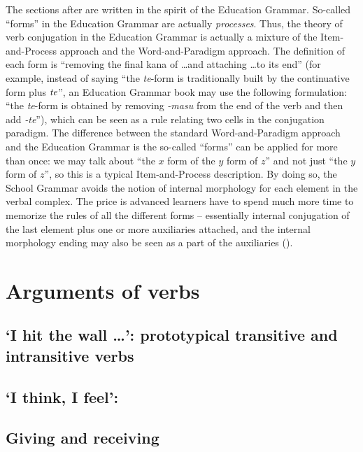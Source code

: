 \documentclass[UTF8, a4paper, oneside, scheme=plain]{ctexrep}
\newcommand{\corpus}[1]{\emph{#1}}
\newcommand{\translate}[1]{`#1'}
\begin{document}
The sections after  are written in the spirit of the Education Grammar.
So-called ``forms'' in the Education Grammar are actually \emph{processes}.
Thus, the theory of verb conjugation in the Education Grammar 
is actually a mixture of the Item-and-Process approach and the Word-and-Paradigm approach.
The definition of each form is 
``removing the final kana of \dots and attaching \dots to its end''
(for example, instead of saying ``the \corpus{te}-form is traditionally built by 
the continuative form plus $\corpus{te}$'',
an Education Grammar book may use the following formulation:
``the \corpus{te}-form is obtained by removing \corpus{-masu} from the end of the verb 
and then add \corpus{-te}''),
which can be seen as a rule relating two cells in the conjugation paradigm.
The difference between the standard Word-and-Paradigm approach and the Education Grammar 
is the so-called ``forms'' can be applied for more than once:
we may talk about ``the $x$ form of the $y$ form of $z$''
and not just ``the $y$ form of $z$'',
so this is a typical Item-and-Process description.
By doing so, the School Grammar avoids 
the notion of internal morphology for each element in the verbal complex.
The price is advanced learners have to spend much more time to memorize the rules of all the different forms 
-- essentially internal conjugation of the last element plus one or more auxiliaries attached,
and the internal morphology ending may also be seen as a part of the auxiliaries 
().

\chapter{Arguments of verbs}\label{chap:arguments}

\section{\translate{I hit the wall \dots}: prototypical transitive and intransitive verbs}

\section{\translate{I think, I feel}: }

\section{Giving and receiving}\label{sec:giving-and-receiving}
\end{document}
